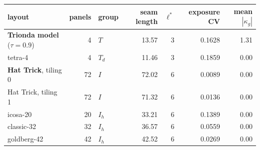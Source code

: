 \begin{tabular}{@{}lrlrrrr@{}}
\toprule
layout & panels & group & seam length & $\ell^*$ & exposure CV & mean $|\kappa_g|$ \\
\midrule
\textbf{Trionda model} ($\tau=0.9$) & 4 & $T$ & 13.57 & 3 & 0.1628 & 1.31 \\
tetra-4 & 4 & $T_d$ & 11.46 & 3 & 0.1859 & 0.00 \\
\textbf{Hat Trick}, tiling 0 & 72 & $I$ & 72.02 & 6 & 0.0089 & 0.00 \\
Hat Trick, tiling 1 & 72 & $I$ & 71.32 & 6 & 0.0136 & 0.00 \\
icosa-20 & 20 & $I_h$ & 33.21 & 6 & 0.1389 & 0.00 \\
classic-32 & 32 & $I_h$ & 36.57 & 6 & 0.0559 & 0.00 \\
goldberg-42 & 42 & $I_h$ & 42.52 & 6 & 0.0269 & 0.00 \\
\bottomrule
\end{tabular}
